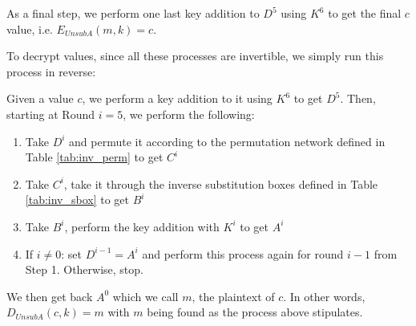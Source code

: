 \documentclass[12pt,a4paper]{article}
\begin{document}
As a final step, we perform one last key addition to $D^5$ using $K^6$ to get the final $c$
value, i.e. $E_{UnsubA}(m,k) = c$. 

To decrypt values, since all these processes are invertible, we simply run this process in reverse:

Given a value $c$, we perform a key addition to it using $K^6$ to get $D^5$.
Then, starting at Round $i=5$, we perform the following:

\begin{enumerate}
    \item Take $D^i$ and permute it according to the permutation network
    defined in Table \ref{tab:inv_perm} to get $C^i$
    \item Take $C^i$, take it through the inverse substitution boxes defined in Table
    \ref{tab:inv_sbox} to get $B^i$
    \item Take $B^i$, perform the key addition with $K^i$ to get $A^i$
    \item If $i \neq 0$: set $D^{i-1} = A^i$ and perform this process again for
    round $i-1$ from Step 1. Otherwise, stop. 
\end{enumerate}

We then get back $A^0$ which we call $m$, the plaintext of $c$. In other words,
$D_{UnsubA}(c,k) = m$ with $m$ being found as the process above stipulates.
\end{document}
